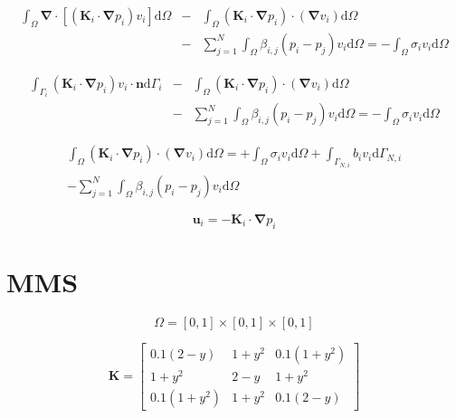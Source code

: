\documentclass[12pt,twoside,a4paper]{article}
\begin{document}
\begin{eqnarray}
\int_\Omega \boldsymbol{\nabla} \cdot \left[ \left( \boldsymbol{K}_i \cdot \boldsymbol{\nabla} p_i \right) v_i  \right]  \mathrm{d}\Omega 
&-& \int_\Omega \left( \boldsymbol{K}_i \cdot \boldsymbol{\nabla} p_i   \right) \cdot \left( \boldsymbol{\nabla} v_i \right) \mathrm{d}\Omega \nonumber \\
&-& \sum_{j=1}^N \int_\Omega \beta_{i,j}(p_i-p_j)v_i\mathrm{d}\Omega =
- \int_\Omega \sigma_iv_i\mathrm{d}\Omega
\end{eqnarray}

\begin{eqnarray}
\int_{\Gamma_{i}} \left( \boldsymbol{K}_i \cdot \boldsymbol{\nabla} p_i \right) v_i \cdot \boldsymbol{n}    \mathrm{d}\Gamma_{i} 
&-& \int_\Omega \left( \boldsymbol{K}_i \cdot \boldsymbol{\nabla} p_i   \right) \cdot \left( \boldsymbol{\nabla} v_i \right) \mathrm{d}\Omega \nonumber \\
&-& \sum_{j=1}^N \int_\Omega \beta_{i,j}(p_i-p_j)v_i\mathrm{d}\Omega =
- \int_\Omega \sigma_iv_i\mathrm{d}\Omega
\end{eqnarray}

\begin{eqnarray}
\int_\Omega \left( \boldsymbol{K}_i \cdot \boldsymbol{\nabla} p_i   \right) \cdot \left( \boldsymbol{\nabla} v_i \right) \mathrm{d}\Omega =
+ \int_\Omega \sigma_iv_i\mathrm{d}\Omega 
+ \int_{\Gamma_{N,i}} b_i v_i     \mathrm{d}\Gamma_{N,i}  \nonumber \\
- \sum_{j=1}^N \int_\Omega \beta_{i,j}(p_i-p_j)v_i\mathrm{d}\Omega
\end{eqnarray}

\begin{equation}
\boldsymbol{u}_i=-\boldsymbol{K}_i \cdot \boldsymbol{\nabla} p_i
\end{equation}

\section{MMS}

\begin{equation}
\Omega = [0,1]\times[0,1]\times[0,1]
\end{equation}

\begin{equation}
\boldsymbol{K} = 
\begin{bmatrix}
    0.1(2 - y)		& 1 + y^2	& 0.1(1 + y^2)  \\
    1 + y^2			& 2 - y		& 1 + y^2  \\
    0.1(1 + y^2)	& 1 + y^2	& 0.1(2 - y) 
\end{bmatrix}
\end{equation}
\end{document}
